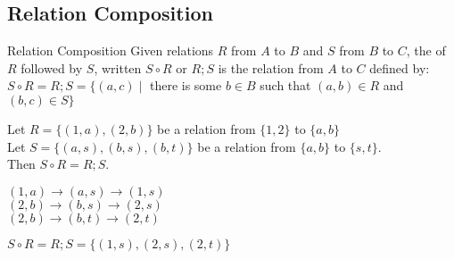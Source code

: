\documentclass[../notes.tex]{subfiles}
\begin{document}
			\subsection{Relation Composition}
				\begin{definition}{Relation Composition}
					Given relations $R$ from $A$ to $B$ and $S$ from $B$ to $C$, the  of $R$ followed by $S$, written $S \circ R$ or $R;S$ is the relation from $A$ to $C$ defined by:\\
					$S \circ R = R;S = \bigl\{(a, c) \mid$ there is some $b \in B$ such that $(a, b) \in R$ and $(b, c) \in S\bigr\}$
				\end{definition}
				\begin{example}[width=0.72\textwidth]
					Let $R = \bigl\{(1, a), (2, b)\bigr\}$ be a relation from $\{1, 2\}$ to $\{a, b\}$\\
					Let $S = \bigl\{(a, s), (b, s), (b, t)\bigr\}$ be a relation from $\{a, b\}$ to $\{s, t\}$.\\
					Then $S \circ R = R;S$.
					\begin{indentparagraph}
						$(1, a) \rightarrow (a, s) \rightarrow (1, s)$\\
						$(2, b) \rightarrow (b, s) \rightarrow (2, s)$\\
						$(2, b) \rightarrow (b, t) \rightarrow (2, t)$
					\end{indentparagraph}
					$S \circ R = R;S = \bigl\{(1, s), (2, s), (2, t)\bigr\}$
				\end{example}
				\pagebreak
\end{document}
